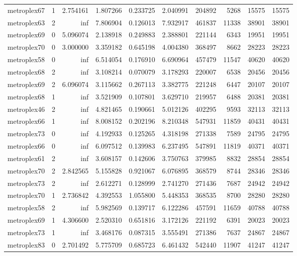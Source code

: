 \begin{longtable}{|l|r|r|r|r|r|r|r|r|r|}
metroplex67 & 1 & 2.754161 & 1.807266 & 0.233725 & 2.040991 & 204892 & 5268 & 15575 & 15575 \\
metroplex63 & 2 & inf & 7.806904 & 0.126013 & 7.932917 & 461837 & 11338 & 38901 & 38901 \\
metroplex69 & 0 & 5.096074 & 2.138918 & 0.249883 & 2.388801 & 221144 & 6343 & 19951 & 19951 \\
metroplex70 & 0 & 3.000000 & 3.359182 & 0.645198 & 4.004380 & 368497 & 8662 & 28223 & 28223 \\
metroplex58 & 0 & inf & 6.514054 & 0.176910 & 6.690964 & 457479 & 11547 & 40620 & 40620 \\
metroplex68 & 2 & inf & 3.108214 & 0.070079 & 3.178293 & 220007 & 6538 & 20456 & 20456 \\
metroplex69 & 2 & 6.096074 & 3.115662 & 0.267113 & 3.382775 & 221248 & 6447 & 20107 & 20107 \\
metroplex68 & 1 & inf & 3.521909 & 0.107801 & 3.629710 & 219957 & 6488 & 20381 & 20381 \\
metroplex46 & 2 & inf & 4.821465 & 0.190661 & 5.012126 & 402295 & 9593 & 32113 & 32113 \\
metroplex66 & 1 & inf & 8.008152 & 0.202196 & 8.210348 & 547931 & 11859 & 40431 & 40431 \\
metroplex73 & 0 & inf & 4.192933 & 0.125265 & 4.318198 & 271338 & 7589 & 24795 & 24795 \\
metroplex66 & 0 & inf & 6.097512 & 0.139983 & 6.237495 & 547891 & 11819 & 40371 & 40371 \\
metroplex61 & 2 & inf & 3.608157 & 0.142606 & 3.750763 & 379985 & 8832 & 28854 & 28854 \\
metroplex70 & 2 & 2.842565 & 5.155828 & 0.921067 & 6.076895 & 368579 & 8744 & 28346 & 28346 \\
metroplex73 & 2 & inf & 2.612271 & 0.128999 & 2.741270 & 271436 & 7687 & 24942 & 24942 \\
metroplex70 & 1 & 2.736842 & 4.392553 & 1.055800 & 5.448353 & 368535 & 8700 & 28280 & 28280 \\
metroplex58 & 2 & inf & 5.982569 & 0.139717 & 6.122286 & 457591 & 11659 & 40788 & 40788 \\
metroplex69 & 1 & 4.306600 & 2.520310 & 0.651816 & 3.172126 & 221192 & 6391 & 20023 & 20023 \\
metroplex73 & 1 & inf & 3.468176 & 0.087315 & 3.555491 & 271386 & 7637 & 24867 & 24867 \\
metroplex83 & 0 & 2.701492 & 5.775709 & 0.685723 & 6.461432 & 542440 & 11907 & 41247 & 41247 \\

\end{longtable}
